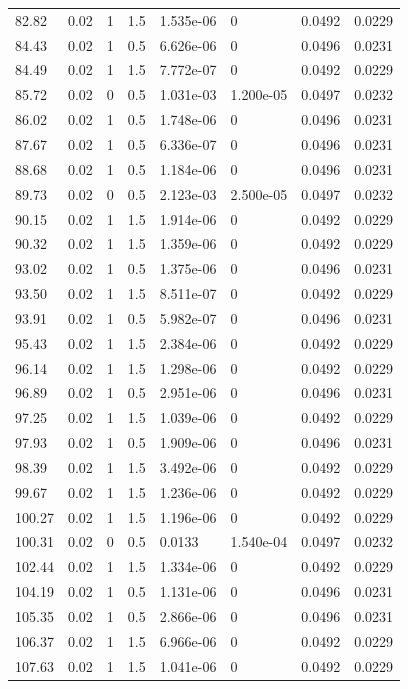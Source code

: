 \documentclass[preview]{standalone}
\begin{document}
{{{\begin{tabular}{L{1.2cm}C{1.2cm} C{0.3cm}C{0.5cm} C{1.4cm}C{1.4cm} C{1.4cm}C{1.4cm}}
  82.82  &  0.02  & 1     & 1.5 &  1.535e-06  & 0  & 0.0492 &  0.0229   \\ 
  84.43  &  0.02  & 1     & 0.5 &  6.626e-06  & 0  & 0.0496 &  0.0231   \\ 
  84.49  &  0.02  & 1     & 1.5 &  7.772e-07  & 0  & 0.0492 &  0.0229   \\ 
  85.72  &  0.02  & 0     & 0.5 &  1.031e-03  & 1.200e-05  & 0.0497 &  0.0232   \\ 
  86.02  &  0.02  & 1     & 0.5 &  1.748e-06  & 0  & 0.0496 &  0.0231   \\ 
  87.67  &  0.02  & 1     & 0.5 &  6.336e-07  & 0  & 0.0496 &  0.0231   \\ 
  88.68  &  0.02  & 1     & 0.5 &  1.184e-06  & 0  & 0.0496 &  0.0231   \\ 
  89.73  &  0.02  & 0     & 0.5 &  2.123e-03  & 2.500e-05  & 0.0497 &  0.0232   \\ 
  90.15  &  0.02  & 1     & 1.5 &  1.914e-06  & 0  & 0.0492 &  0.0229   \\ 
  90.32  &  0.02  & 1     & 1.5 &  1.359e-06  & 0  & 0.0492 &  0.0229   \\ 
  93.02  &  0.02  & 1     & 0.5 &  1.375e-06  & 0  & 0.0496 &  0.0231   \\ 
  93.50  &  0.02  & 1     & 1.5 &  8.511e-07  & 0  & 0.0492 &  0.0229   \\ 
  93.91  &  0.02  & 1     & 0.5 &  5.982e-07  & 0  & 0.0496 &  0.0231   \\ 
  95.43  &  0.02  & 1     & 1.5 &  2.384e-06  & 0  & 0.0492 &  0.0229   \\ 
  96.14  &  0.02  & 1     & 1.5 &  1.298e-06  & 0  & 0.0492 &  0.0229   \\ 
  96.89  &  0.02  & 1     & 0.5 &  2.951e-06  & 0  & 0.0496 &  0.0231   \\ 
  97.25  &  0.02  & 1     & 1.5 &  1.039e-06  & 0  & 0.0492 &  0.0229   \\ 
  97.93  &  0.02  & 1     & 0.5 &  1.909e-06  & 0  & 0.0496 &  0.0231   \\ 
  98.39  &  0.02  & 1     & 1.5 &  3.492e-06  & 0  & 0.0492 &  0.0229   \\ 
  99.67  &  0.02  & 1     & 1.5 &  1.236e-06  & 0  & 0.0492 &  0.0229   \\ 
  100.27  &  0.02  & 1     & 1.5 &  1.196e-06  & 0  & 0.0492 &  0.0229   \\ 
  100.31  &  0.02  & 0     & 0.5 &  0.0133  & 1.540e-04  & 0.0497 &  0.0232   \\ 
  102.44  &  0.02  & 1     & 1.5 &  1.334e-06  & 0  & 0.0492 &  0.0229   \\ 
  104.19  &  0.02  & 1     & 0.5 &  1.131e-06  & 0  & 0.0496 &  0.0231   \\ 
  105.35  &  0.02  & 1     & 0.5 &  2.866e-06  & 0  & 0.0496 &  0.0231   \\ 
  106.37  &  0.02  & 1     & 1.5 &  6.966e-06  & 0  & 0.0492 &  0.0229   \\ 
  107.63  &  0.02  & 1     & 1.5 &  1.041e-06  & 0  & 0.0492 &  0.0229   \\ 
\hline 
\end{tabular} 

}}}
\end{document}
